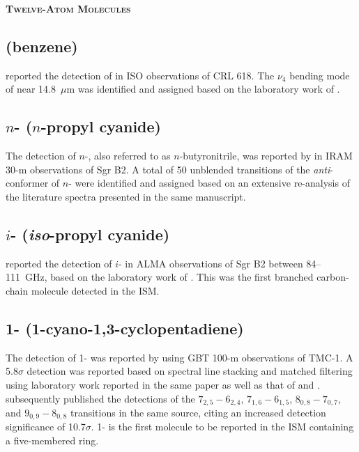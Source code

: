 \documentclass[twocolumn]{aastex631}
\newcommand{\update}[1]{{#1}}
\begin{document}
    
    \begin{center}
        \large
        \textsc{\textbf{Twelve-Atom Molecules}}
        \label{12atoms}
        \normalsize
    \end{center}	
	
	\subsection{ (benzene)}
	\label{C6H6}
	
	\citet{Cernicharo:2001mw} reported the detection of  in ISO observations of CRL 618.  The $\nu_4$ bending mode of  near 14.8~$\mu$m was identified and assigned based on the laboratory work of \citet{Lindenmayer:1988kx}.
	
	\subsection{$n$- ($n$-propyl cyanide)}
	\label{n-C3H7CN}
	
	The detection of $n$-, also referred to as $n$-butyronitrile, was reported by \citet{Belloche:2009ki} in IRAM 30-m observations of Sgr B2.  A total of 50 unblended transitions of the \emph{anti}-conformer of $n$- were identified and assigned based on an extensive re-analysis of the literature spectra presented in the same manuscript.  
	
	\subsection{$i$- (\emph{iso}-propyl cyanide)}
	\label{i-C3H7CN}	
	
	\citet{Belloche:2014jd} reported the detection of $i$- in ALMA observations of Sgr B2 between 84--111~GHz, based on the laboratory work of \citet{Muller:2011bz}. This was the first branched carbon-chain molecule detected in the ISM.
	
	\subsection{\update{1- (1-cyano-1,3-cyclopentadiene)}}
	\label{1-C5H5CN}
	
	\update{The detection of 1- was reported by \citet{McCarthy:2021aa} using GBT 100-m observations of TMC-1.  A 5.8$\sigma$ detection was reported based on spectral line stacking and matched filtering using laboratory work reported in the same paper as well as that of \citet{1978JMoSp..69..326F} and \citet{1987BCSJ..60..3903S}.  \citet{Lee:2021ud} subsequently published the detections of the $7_{2,5} - 6_{2,4}$, $7_{1,6} - 6_{1,5}$, $8_{0,8} - 7_{0,7}$, and $9_{0,9} - 8_{0,8}$ transitions in the same source, citing an increased detection significance of 10.7$\sigma$.  1-\ce{C5H5CN} is the first molecule to be reported in the ISM containing a five-membered ring.}
	
\end{document}
